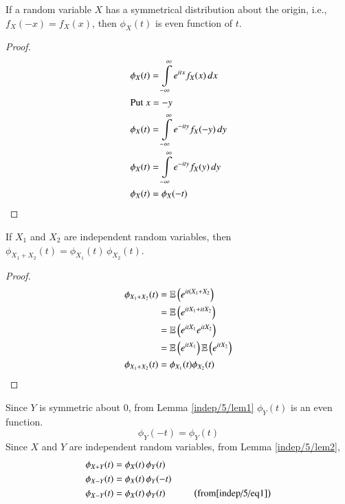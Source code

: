 \begin{lemma}
    \label{indep/5/lem1}
    If a random variable $X$ has a symmetrical distribution about the origin, i.e.,\\
    $f_X(-x) = f_X(x)$, then $\phi_X(t)$ is even function of $t$.
    \end{lemma}
    \begin{proof}
    \begin{align}
        \phi_X(t) &= \int \limits_{-\infty}^{\infty} e^{itx}f_X(x) \, dx \\
        \intertext{Put $x = -y$}
        \phi_X(t) &= \int \limits_{-\infty}^{\infty} e^{-ity}f_X(-y) \, dy \\
        \phi_X(t) &= \int \limits_{-\infty}^{\infty} e^{-ity}f_X(y) \, dy \\
        \phi_X(t) &= \phi_X(-t)
    \end{align}
    \end{proof}
    \begin{lemma}
        \label{indep/5/lem2}
    If $X_1$ and $X_2$ are independent random variables, then $\phi_{X_1 + X_2}(t) = \phi_{X_1}(t)\, \phi_{X_2}(t)$.
    \end{lemma}
    \begin{proof}
    \begin{align}
        \phi_{X_1 + X_2}(t) &= \mathbb{E}\left(e^{it(X_1+X_2}\right)\\
        &= \mathbb{E}\left(e^{itX_1+itX_2}\right)\\
        &= \mathbb{E}\left(e^{itX_1}e^{itX_2}\right)\\
        &= \mathbb{E}\left(e^{itX_1}\right)\mathbb{E}\left(e^{itX_2}\right)\\
        \phi_{X_1 + X_2}(t) &= \phi_{X_1}(t)\phi_{X_2}(t)
    \end{align}
    \end{proof}
    Since $Y$ is symmetric about $0$, from Lemma     \ref{indep/5/lem1} $\phi_Y(t)$ is an even function.
    \begin{equation}
        \phi_Y(-t) = \phi_Y(t) \label{indep/5/eq1}
    \end{equation}
    Since $X$ and $Y$ are independent random variables, from Lemma \ref{indep/5/lem2},
    \begin{align}
        \phi_{X+Y}(t) &= \phi_X(t)\, \phi_Y(t) \label{indep/5/eq2}\\
        \phi_{X-Y}(t) &= \phi_X(t)\, \phi_Y(-t) \label{indep/5/eq3}\\
        \phi_{X-Y}(t) &= \phi_X(t)\, \phi_Y(t) \hspace{1cm}\left(\text{from} \eqref{indep/5/eq1}\right) \label{indep/5/eq4}
    \end{align}

